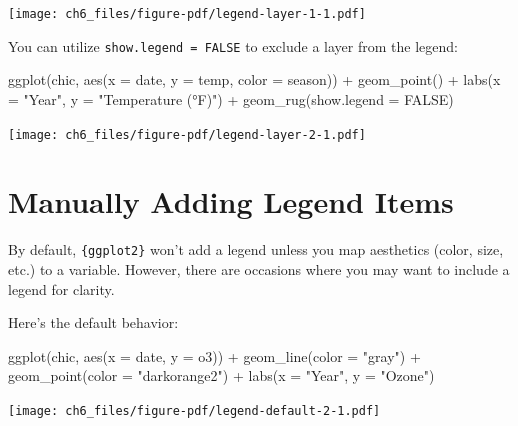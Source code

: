 \documentclass[
  letterpaper,
  DIV=11,
  numbers=noendperiod]{scrreprt}
\newenvironment{Shaded}{\begin{snugshade}}{\end{snugshade}}
\newcommand{\AttributeTok}[1]{\textcolor[rgb]{0.40,0.45,0.13}{#1}}
\newcommand{\ConstantTok}[1]{\textcolor[rgb]{0.56,0.35,0.01}{#1}}
\newcommand{\FunctionTok}[1]{\textcolor[rgb]{0.28,0.35,0.67}{#1}}
\newcommand{\NormalTok}[1]{\textcolor[rgb]{0.00,0.23,0.31}{#1}}
\newcommand{\SpecialCharTok}[1]{\textcolor[rgb]{0.37,0.37,0.37}{#1}}
\newcommand{\StringTok}[1]{\textcolor[rgb]{0.13,0.47,0.30}{#1}}
\begin{document}
\texttt{[image: ch6\_files/figure-pdf/legend-layer-1-1.pdf]}

You can utilize \texttt{show.legend\ =\ FALSE} to exclude a layer from
the legend:

\begin{Shaded}
\begin{Highlighting}[]
\FunctionTok{ggplot}\NormalTok{(chic, }\FunctionTok{aes}\NormalTok{(}\AttributeTok{x =}\NormalTok{ date, }\AttributeTok{y =}\NormalTok{ temp, }\AttributeTok{color =}\NormalTok{ season)) }\SpecialCharTok{+}
  \FunctionTok{geom\_point}\NormalTok{() }\SpecialCharTok{+}
  \FunctionTok{labs}\NormalTok{(}\AttributeTok{x =} \StringTok{"Year"}\NormalTok{, }\AttributeTok{y =} \StringTok{"Temperature (°F)"}\NormalTok{) }\SpecialCharTok{+}
  \FunctionTok{geom\_rug}\NormalTok{(}\AttributeTok{show.legend =} \ConstantTok{FALSE}\NormalTok{)}
\end{Highlighting}
\end{Shaded}

\texttt{[image: ch6\_files/figure-pdf/legend-layer-2-1.pdf]}

\section{Manually Adding Legend
Items}\label{manually-adding-legend-items}

By default, \texttt{\{ggplot2\}} won't add a legend unless you map
aesthetics (color, size, etc.) to a variable. However, there are
occasions where you may want to include a legend for clarity.

Here's the default behavior:

\begin{Shaded}
\begin{Highlighting}[]
\FunctionTok{ggplot}\NormalTok{(chic, }\FunctionTok{aes}\NormalTok{(}\AttributeTok{x =}\NormalTok{ date, }\AttributeTok{y =}\NormalTok{ o3)) }\SpecialCharTok{+}
  \FunctionTok{geom\_line}\NormalTok{(}\AttributeTok{color =} \StringTok{"gray"}\NormalTok{) }\SpecialCharTok{+}
  \FunctionTok{geom\_point}\NormalTok{(}\AttributeTok{color =} \StringTok{"darkorange2"}\NormalTok{) }\SpecialCharTok{+}
  \FunctionTok{labs}\NormalTok{(}\AttributeTok{x =} \StringTok{"Year"}\NormalTok{, }\AttributeTok{y =} \StringTok{"Ozone"}\NormalTok{)}
\end{Highlighting}
\end{Shaded}

\texttt{[image: ch6\_files/figure-pdf/legend-default-2-1.pdf]}
\end{document}
